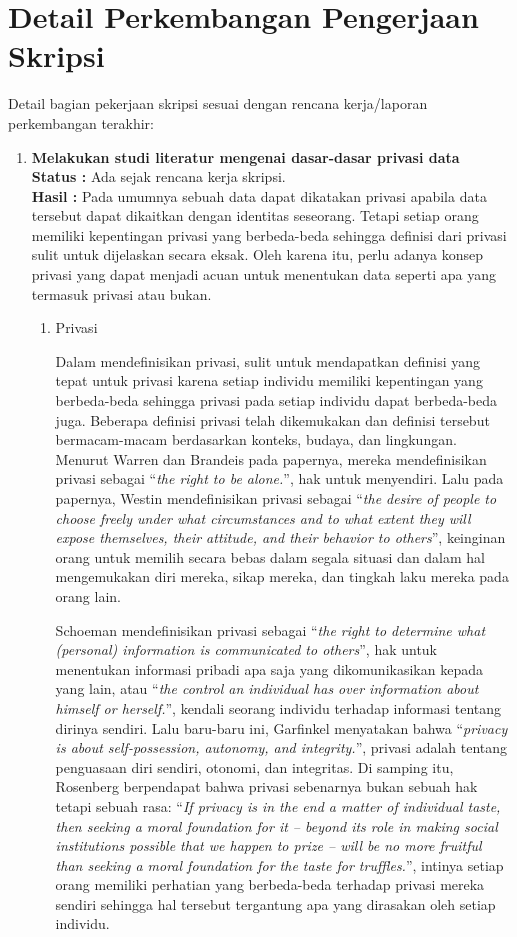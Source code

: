 \documentclass[a4paper,twoside]{article}
\begin{document}
\section{Detail Perkembangan Pengerjaan Skripsi}
Detail bagian pekerjaan skripsi sesuai dengan rencana kerja/laporan perkembangan terakhir:
	\begin{enumerate}
		\item \textbf{Melakukan studi literatur mengenai dasar-dasar privasi data}\\
		{\bf Status :} Ada sejak rencana kerja skripsi.\\
		{\bf Hasil :} Pada umumnya sebuah data dapat dikatakan privasi apabila data tersebut dapat dikaitkan dengan identitas seseorang. Tetapi setiap orang memiliki kepentingan privasi yang berbeda-beda sehingga definisi dari privasi sulit untuk dijelaskan secara eksak. Oleh karena itu, perlu adanya konsep privasi yang dapat menjadi acuan untuk menentukan data seperti apa yang termasuk privasi atau bukan.
		\begin{enumerate}
			\item Privasi
			
			Dalam mendefinisikan privasi, sulit untuk mendapatkan definisi yang tepat untuk privasi karena setiap individu memiliki kepentingan yang berbeda-beda sehingga privasi pada setiap individu dapat berbeda-beda juga. Beberapa definisi privasi telah dikemukakan dan definisi tersebut bermacam-macam berdasarkan konteks, budaya, dan lingkungan. Menurut Warren dan Brandeis pada papernya, mereka mendefinisikan privasi sebagai “\textit{the right to be alone.}”, hak untuk menyendiri. Lalu pada papernya, Westin mendefinisikan privasi sebagai “\textit{the desire of people to choose freely under what circumstances and to what extent they will expose themselves, their attitude, and their behavior to others}”, keinginan orang untuk memilih secara bebas dalam segala situasi dan dalam hal mengemukakan diri mereka, sikap mereka, dan tingkah laku mereka pada orang lain. 
			
			Schoeman mendefinisikan privasi sebagai “\textit{the right to determine what (personal) information is communicated to others}”, hak untuk menentukan informasi pribadi apa saja yang dikomunikasikan kepada yang lain, atau “\textit{the control an individual has over information about himself or herself.}”, kendali seorang individu terhadap informasi tentang dirinya sendiri. Lalu baru-baru ini, Garfinkel menyatakan bahwa “\textit{privacy is about self-possession, autonomy, and integrity.}”, privasi adalah tentang penguasaan diri sendiri, otonomi, dan integritas. Di samping itu, Rosenberg berpendapat bahwa privasi sebenarnya bukan sebuah hak tetapi sebuah rasa: “\textit{If privacy is in the end a matter of individual taste, then seeking a moral foundation for it -- beyond its role in making social institutions possible that we happen to prize -- will be no more fruitful than seeking a moral foundation for the taste for truffles.}”, intinya setiap orang memiliki perhatian yang berbeda-beda terhadap privasi mereka sendiri sehingga hal tersebut tergantung apa yang dirasakan oleh setiap individu.


\end{enumerate}
\end{enumerate}
\end{document}
